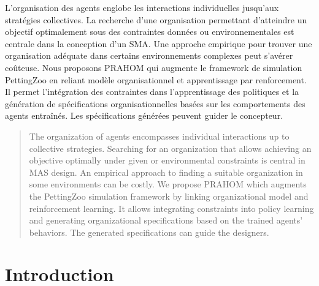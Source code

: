 \documentclass[demonstration]{jfsma}
\begin{document}
\maketitle

\begin{resume}

L'organisation des agents englobe les interactions individuelles jusqu'aux stratégies collectives. La recherche d'une organisation permettant d'atteindre un objectif optimalement sous des contraintes données ou environnementales est centrale dans la conception d'un SMA.
%
Une approche empirique pour trouver une organisation adéquate dans certains environnements complexes peut s'avérer coûteuse.
%
Nous proposons PRAHOM qui augmente le framework de simulation PettingZoo en reliant modèle organisationnel et apprentissage par renforcement. Il permet l'intégration des contraintes dans l'apprentissage des politiques et la génération de spécifications organisationnelles basées sur les comportements des agents entraînés.
Les spécifications générées peuvent guider le concepteur.

\end{resume}


\bigskip

\begin{abstract}

The organization of agents encompasses individual interactions up to collective strategies. Searching for an organization that allows achieving an objective optimally under given or environmental constraints is central in MAS design.
%
An empirical approach to finding a suitable organization in some environments can be costly.
%
We propose PRAHOM which augments the PettingZoo simulation framework by linking organizational model and reinforcement learning. It allows integrating constraints into policy learning and generating organizational specifications based on the trained agents' behaviors. The generated specifications can guide the designers.

\end{abstract}


\section{Introduction}
\end{document}
